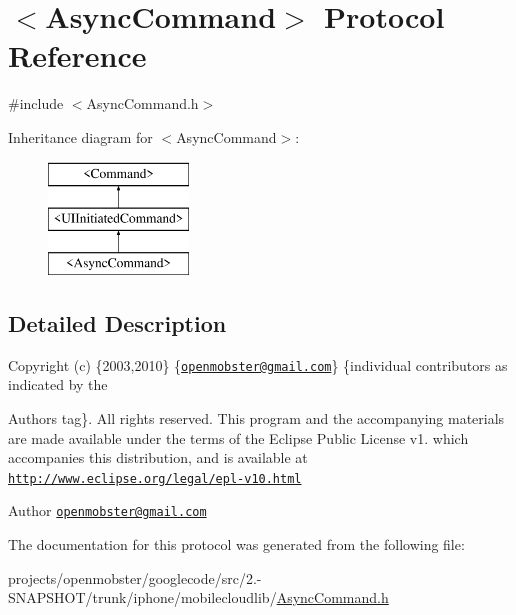 \hypertarget{protocol_async_command-p}{
\section{$<$\-Async\-Command$>$ \-Protocol \-Reference}
\label{protocol_async_command-p}
}


{\ttfamily \#include $<$\-Async\-Command.\-h$>$}

\-Inheritance diagram for $<$\-Async\-Command$>$\-:\begin{figure}[H]
\begin{center}
\leavevmode
\includegraphics[height=3.000000cm]{protocol_async_command-p}
\end{center}
\end{figure}


\subsection{\-Detailed \-Description}
\-Copyright (c) \{2003,2010\} \{\href{mailto:openmobster@gmail.com}{\tt openmobster@gmail.\-com}\} \{individual contributors as indicated by the \begin{DoxyAuthor}{\-Authors}
tag\}. \-All rights reserved. \-This program and the accompanying materials are made available under the terms of the \-Eclipse \-Public \-License v1. which accompanies this distribution, and is available at \href{http://www.eclipse.org/legal/epl-v10.html}{\tt http\-://www.\-eclipse.\-org/legal/epl-\/v10.\-html}
\end{DoxyAuthor}
\begin{DoxyAuthor}{\-Author}
\href{mailto:openmobster@gmail.com}{\tt openmobster@gmail.\-com} 
\end{DoxyAuthor}


\-The documentation for this protocol was generated from the following file\-:\begin{DoxyCompactItemize}
\item 
projects/openmobster/googlecode/src/2.-\/\-S\-N\-A\-P\-S\-H\-O\-T/trunk/iphone/mobilecloudlib/\hyperlink{_async_command_8h}{\-Async\-Command.\-h}\end{DoxyCompactItemize}
